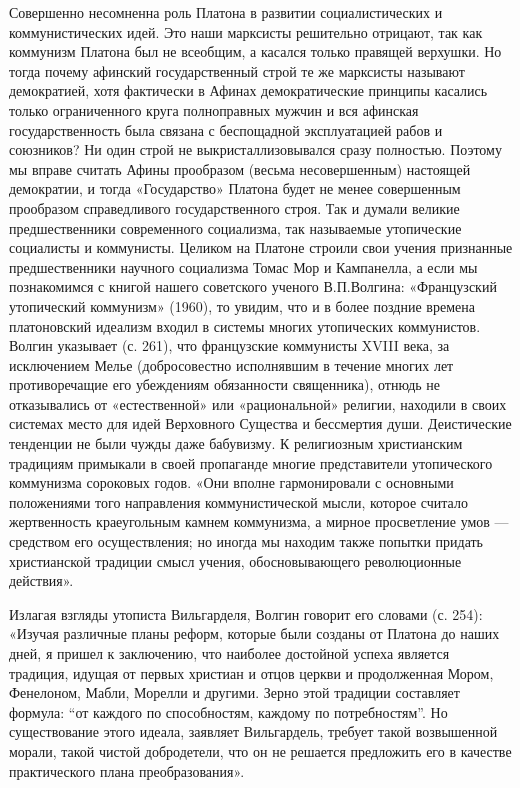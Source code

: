 Совершенно несомненна роль Платона в развитии социалистических и
коммунистических идей. Это наши марксисты решительно отрицают, так как
коммунизм Платона был не всеобщим, а касался только правящей верхушки.
Но тогда почему афинский государственный строй те же марксисты
называют демократией, хотя фактически в Афинах демократические
принципы касались только ограниченного круга полноправных мужчин и вся
афинская государственность была связана с беспощадной эксплуатацией
рабов и союзников? Ни один строй не выкристаллизовывался сразу
полностью. Поэтому мы вправе считать Афины прообразом (весьма
несовершенным) настоящей демократии, и тогда «Государство» Платона
будет не менее совершенным прообразом справедливого государственного
строя. Так и думали великие предшественники современного социализма,
так называемые утопические социалисты и коммунисты. Целиком на Платоне
строили свои учения признанные предшественники научного социализма
Томас Мор и Кампанелла, а если мы познакомимся с книгой нашего
советского ученого В.П.Волгина: «Французский утопический коммунизм»
(1960), то увидим, что и в более поздние времена платоновский идеализм
входил в системы многих утопических коммунистов. Волгин указывает (с.
261), что французские коммунисты XVIII века, за исключением Мелье
(добросовестно исполнявшим в течение многих лет противоречащие его
убеждениям обязанности священника), отнюдь не отказывались от
«естественной» или «рациональной» религии, находили в своих системах
место для идей Верховного Существа и бессмертия души. Деистические
тенденции не были чужды даже бабувизму. К религиозным христианским
традициям примыкали в своей пропаганде многие представители
утопического коммунизма сороковых годов. «Они вполне гармонировали с
основными положениями того направления коммунистической мысли, которое
считало жертвенность краеугольным камнем коммунизма, а мирное
просветление умов --- средством его осуществления; но иногда мы
находим также попытки придать христианской традиции смысл учения,
обосновывающего революционные действия».

Излагая взгляды утописта Вильгарделя, Волгин говорит его словами (с.
254): «Изучая различные планы реформ, которые были созданы от Платона
до наших дней, я пришел к заключению, что наиболее достойной успеха
является традиция, идущая от первых христиан и отцов церкви и
продолженная Мором, Фенелоном, Мабли, Морелли и другими. Зерно этой
традиции составляет формула: ``от каждого по способностям, каждому по
потребностям''. Но существование этого идеала, заявляет Вильгардель,
требует такой возвышенной морали, такой чистой добродетели, что он не
решается предложить его в качестве практического плана
преобразования».

